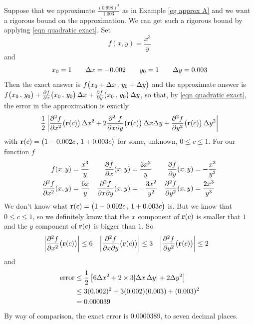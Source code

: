 \begin{eg}\label{eg error}
Suppose that we approximate
$\frac{(0.998)^3}{1.003}$ as in Example \ref{eg approx A}
 and we want a rigorous
bound on the approximation. We can get such a rigorous bound by 
applying \eqref{eqn quadratic exact}. Set 
\begin{equation*}
f(x,y)=\frac{x^3}{y}
\end{equation*}
and
\begin{equation*}
x_0=1\qquad 
\Delta x=-0.002\qquad
y_0=1\qquad
\Delta y=0.003
\end{equation*}
Then the exact answer is $f\big(x_0 + \Delta x\,,\,y_0+\Delta y\big)$
and the approximate answer is $f\big(x_0\,,\,y_0\big) 
       + \pdiff{f}{x}\big(x_0\,,\,y_0\big)\,\De x
       + \pdiff{f}{y}\big(x_0\,,\,y_0\big)\,\De y$,
so that, by \eqref{eqn quadratic exact}, the error in the
approximation is exactly
\begin{align*}
\frac{1}{2}\left|
        \frac{\partial^2 f}{\partial x^2}\big(\mathbf{r}(c)\big)\,\Delta x^2
       +2\frac{\partial^2\ f}{\partial x\partial y}
                                     \big(\mathbf{r}(c)\big) \,\Delta x\Delta y 
       + \frac{\partial^2 f}{\partial y^2}\big(\mathbf{r}(c)\big)\,\Delta y^2
       \right|
\end{align*}
with
   $\mathbf{r}(c) = \big(1-0.002 c\,,\,1+0.003 c\big)$
for some, unknown, $0\le c\le 1$. For our function $f$
\begin{align*}
f(x,y)&=\frac{x^3}{y} &
\pdiff{f}{x}(x,y)&=\frac{3 x^2}{y} &
\pdiff{f}{y}(x,y)&=-\frac{x^3}{y^2} \\
\frac{\partial^2 f}{\partial x^2}(x,y)&=\frac{6 x}{y} &
\frac{\partial^2 f}{\partial x\partial y}(x,y)&=-\frac{3 x^2}{y^2} &
\frac{\partial^2 f}{\partial y^2}(x,y)&=\frac{2 x^3}{y^3} 
\end{align*}
We don't know what $\mathbf{r}(c)=\big(1-0.002 c\,,\,1+0.003 c\big)$ is. 
But we know that $0\le c\le 1$, so we definitely know that the $x$ component
of $\mathbf{r}(c)$ is smaller that $1$ and the $y$ component of $\mathbf{r}(c)$ is bigger
than $1$. So
\begin{align*}
\left|\frac{\partial^2 f}{\partial x^2}\big(\mathbf{r}(c)\big)\right|&\le 6 &
\left|\frac{\partial^2 f}{\partial x\partial y}\big(\mathbf{r}(c)\big)\right|&\le 3 &
\left|\frac{\partial^2 f}{\partial y^2}\big(\mathbf{r}(c)\big)\right|&\le 2
\end{align*}
and
\begin{align*}
\text{error}
&\le \frac{1}{2}\left[6\Delta x^2  +2\times 3 |\Delta x\,\Delta y| +2\Delta y^2\right] \\
&\le 3(0.002)^2 + 3(0.002)(0.003) +(0.003)^2 \\
&= 0.000039
\end{align*}
By way of comparison, the exact error is 0.0000389, to seven decimal places.
\end{eg}

